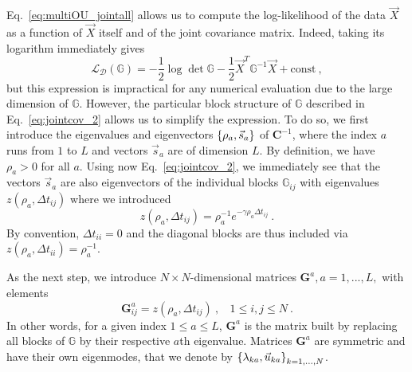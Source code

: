 \documentclass[preprint,amsmath,amssymb,superscriptaddress,showpacs,pre]{revtex4-1}
\let\originalleft\left
\let\originalright\right
\renewcommand{\left}{\mathopen{}\mathclose\bgroup\originalleft}
\renewcommand{\right}{\aftergroup\egroup\originalright}
\newcommand{\iC}{\bm{C}^{-1}}
\newcommand{\vsa}{\vec{s}_a}
\newcommand{\vuka}{\vec{u}_{ka}}
\begin{document}
Eq.~\eqref{eq:multiOU_jointall} allows us to compute the log-likelihood of the data $\vec{X}$ as a function of $\vec{X}$ itself and of the joint covariance matrix. Indeed, taking its logarithm immediately gives
\begin{equation}
	\mathcal{L}_{\mathcal{D}}(\mathbb{G}) = -\frac 1 2 \log \det  \mathbb{G}  -\frac 1 2 \vec{X}^T\mathbb{G}^{-1} \vec{X} + \text{const}\ ,
	\label{eq:likelihood_2}
\end{equation}
but this expression is impractical for any numerical evaluation due to the large dimension of $\mathbb{G}$. However, the particular block structure of $\mathbb{G}$ described in Eq.~\eqref{eq:jointcov_2} allows us to simplify the expression. To do so, we first introduce the eigenvalues and eigenvectors 
$\left\{\rho_a, \vsa\right\}$ of $\iC$, where the index $a$ runs from $1$ to $L$ and vectors $\vsa$ are of dimension $L$. By definition, we have $\rho_a>0$ for all $a$.  Using now Eq.~\eqref{eq:jointcov_2}, we immediately see that the vectors $\vsa$ are also eigenvectors of the individual blocks $\mathbb{G}_{ij}$ with eigenvalues $z(\rho_a, \Delta t_{ij})$ where we introduced
\begin{equation}
	z(\rho_a, \Delta t_{ij}) = \rho_a^{-1}e^{-\gamma\rho_a\Delta t_{ij}} \ .
	\label{eq:z}
\end{equation}
By convention, $\Delta t_{ii} = 0$ and the diagonal blocks are thus included via $z(\rho_a, \Delta t_{ii}) = \rho_a^{-1}$.


As the next step, we introduce $N\times N$-dimensional matrices ${\bm G}^a, a=1,...,L,$ with elements 
\begin{equation}
	{\bm G}^a_{ij} = z(\rho_a, \Delta t_{ij})\ ,\ \ \ \ 1\leq i,j\leq N\ .
	\label{eq:subG_def}
\end{equation}
In other words, for a given index $1\leq a\leq L$, ${\bm G}^a$ is the matrix built by replacing all blocks of $\mathbb{G}$ by their respective $a$th eigenvalue.
Matrices ${\bm G}^a$ are symmetric and have their own eigenmodes, that we denote by $\left\{\lambda_{ka}, \vuka\right\}_{k=1,...,N}$.
\end{document}
